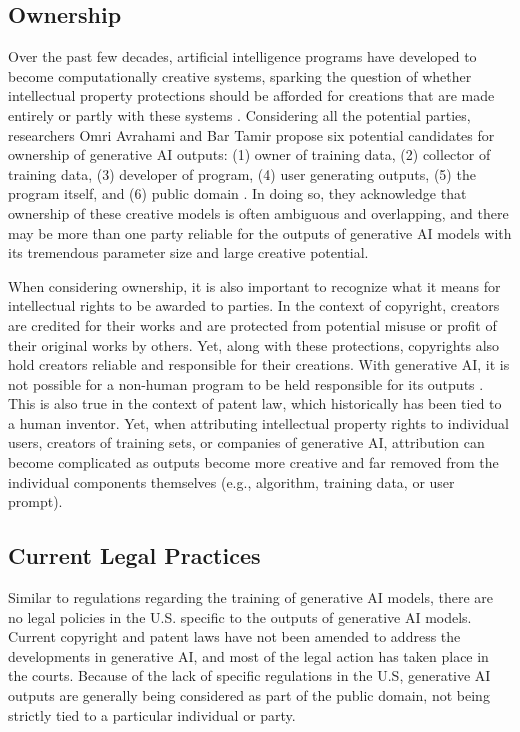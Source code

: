 \documentclass[manuscript,screen]{acmart}
\begin{document}
\subsection{Ownership}
Over the past few decades, artificial intelligence programs have developed to become computationally creative systems, sparking the question of whether intellectual property protections should be afforded for creations that are made entirely or partly with these systems \cite{PAPER:5}. Considering all the potential parties, researchers Omri Avrahami and Bar Tamir propose six potential candidates for ownership of generative AI outputs: (1) owner of training data, (2) collector of training data, (3) developer of program, (4) user generating outputs, (5) the program itself, and (6) public domain \cite{PAPER:11}. In doing so, they acknowledge that ownership of these creative models is often ambiguous and overlapping, and there may be more than one party reliable for the outputs of generative AI models with its tremendous parameter size and large creative potential. 

When considering ownership, it is also important to recognize what it means for intellectual rights to be awarded to parties. In the context of copyright, creators are credited for their works and are protected from potential misuse or profit of their original works by others. Yet, along with these protections, copyrights also hold creators reliable and responsible for their creations. With generative AI, it is not possible for a non-human program to be held responsible for its outputs \cite{PAPER:1}. This is also true in the context of patent law, which historically has been tied to a human inventor. Yet, when attributing intellectual property rights to individual users, creators of training sets, or companies of generative AI, attribution can become complicated as outputs become more creative and far removed from the individual components themselves (e.g., algorithm, training data, or user prompt). 

\subsection{Current Legal Practices}
Similar to regulations regarding the training of generative AI models, there are no legal policies in the U.S. specific to the outputs of generative AI models. Current copyright and patent laws have not been amended to address the developments in generative AI, and most of the legal action has taken place in the courts. Because of the lack of specific regulations in the U.S, generative AI outputs are generally being considered as part of the public domain, not being strictly tied to a particular individual or party. 
\end{document}
